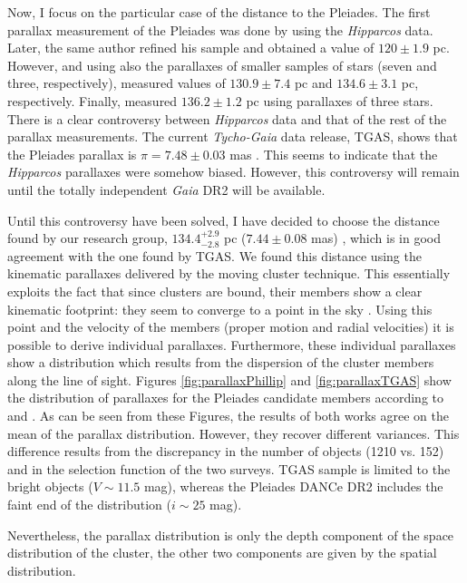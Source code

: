 Now, I focus on the particular case of the distance to the Pleiades. The first parallax measurement of the Pleiades was done by \citet{1999A&A...341L..71V} using the \emph{Hipparcos} data. Later, the same author \citep{2009A&A...497..209V} refined his sample and obtained a value of $120\pm1.9$ pc. However, \citet{2000ApJ...533..938G} and \citet{2005AJ....129.1616S} using also the parallaxes of smaller samples of stars (seven and three, respectively), measured values of $130.9\pm7.4$ pc and $134.6\pm3.1$ pc, respectively. Finally, \citet{2014Sci...345.1029M} measured $136.2\pm1.2$ pc using parallaxes of three stars. There is a clear controversy between \emph{Hipparcos} data and that of the rest of the parallax measurements. The current \emph{Tycho-Gaia} data release, TGAS, shows that the Pleiades parallax is $\pi = 7.48\pm0.03$ mas \citep{2017A&A...601A..19G}. This seems to indicate that the \emph{Hipparcos} parallaxes were somehow biased. However, this controversy will remain until the totally independent \emph{Gaia} DR2 will be available.

Until this controversy have been solved, I have decided to choose the distance found by our research group, $134.4^{+2.9}_{-2.8} $ pc ($7.44\pm0.08$ mas) \citep{Galli2017}, which is in good agreement with the one found by TGAS. We found this distance using the kinematic parallaxes delivered by the moving cluster technique. This essentially exploits the fact that since clusters are bound, their members show a clear kinematic footprint: they seem to converge to a point in the sky \citep{1964IAUS...20...50B}. Using this point and the velocity of the members (proper motion and radial velocities) it is possible to derive individual parallaxes. Furthermore, these individual parallaxes show a distribution which results from the dispersion of the cluster members along the line of sight. Figures \ref{fig:parallaxPhillip} and \ref{fig:parallaxTGAS} show the distribution of parallaxes for the Pleiades candidate members according to \citet{Galli2017} and \citet{2017A&A...601A..19G}. As can be seen from these Figures, the results of both works agree on the mean of the parallax distribution. However, they recover different variances. This difference results from the discrepancy in the number of objects (1210 vs. 152) and in the selection function of the two surveys. TGAS sample is limited to the bright objects ($V \sim 11.5$ mag), whereas the Pleiades DANCe DR2 includes the faint end of the distribution ($i\sim25$ mag).

Nevertheless, the parallax distribution is only the depth component of the space distribution of the cluster, the other two components are given by the spatial distribution. 

